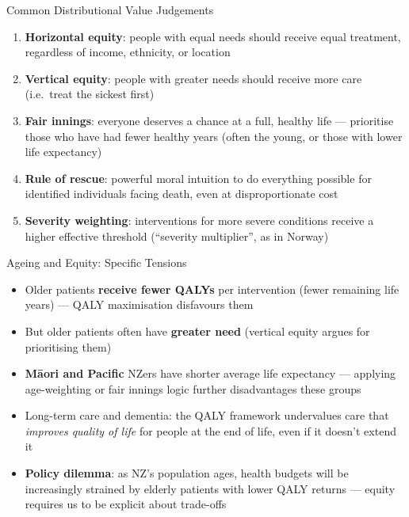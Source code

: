 \documentclass[aspectratio=169, 12pt]{beamer}
\begin{document}
\begin{frame}{Common Distributional Value Judgements}
  \begin{enumerate}
    \item \textbf{Horizontal equity}: people with equal needs should receive equal treatment,
          regardless of income, ethnicity, or location
    \item \textbf{Vertical equity}: people with greater needs should receive more care
          (i.e.\ treat the sickest first)
    \item \textbf{Fair innings}: everyone deserves a chance at a full, healthy life ---
          prioritise those who have had fewer healthy years (often the young, or those with
          lower life expectancy)
    \item \textbf{Rule of rescue}: powerful moral intuition to do everything possible for
          identified individuals facing death, even at disproportionate cost
    \item \textbf{Severity weighting}: interventions for more severe conditions receive a
          higher effective threshold (``severity multiplier'', as in Norway)
  \end{enumerate}
\end{frame}

\begin{frame}{Ageing and Equity: Specific Tensions}
  \begin{itemize}
    \item Older patients \textbf{receive fewer QALYs} per intervention (fewer remaining
          life years) --- QALY maximisation disfavours them
    \item But older patients often have \textbf{greater need} (vertical equity argues for
          prioritising them)
    \item \textbf{Māori and Pacific} NZers have shorter average life expectancy --- applying
          age-weighting or fair innings logic further disadvantages these groups
    \item Long-term care and dementia: the QALY framework undervalues care that \emph{improves
          quality of life} for people at the end of life, even if it doesn't extend it
    \item \textbf{Policy dilemma}: as NZ's population ages, health budgets will be
          increasingly strained by elderly patients with lower QALY returns --- equity requires
          us to be explicit about trade-offs
  \end{itemize}
\end{frame}
\end{document}
